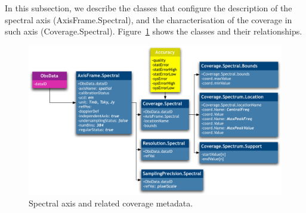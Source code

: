 			In this subsection, we describe the classes that
			configure the description of the spectral axis
			(AxisFrame.Spectral), and the characterisation of the
			coverage in such axis (Coverage.Spectral).
			Figure~\ref{figAxisFrameSpectral} shows the classes and
			their relationships.
			
			\begin{figure}[tbp]
			\begin{center}
			\includegraphics[width=\columnwidth]
			{fig/AxisFrame-Spectral-DM}
			\end{center}
			\caption[Spectral axis metadata]{
				Spectral axis and related coverage metadata.
			}
			\label{figAxisFrameSpectral}
			\end{figure}

